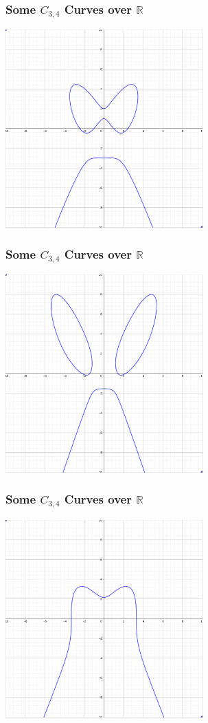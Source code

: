 \documentclass{beamer}
\newcommand{\bb}[1]{\mathbb{#1}}
\begin{document}
\begin{frame}
\frametitle{Some $C_{3,4}$ Curves over $\bb R$}
  \begin{center} \includegraphics[height=7.6cm]{curve1.png} \end{center}
\end{frame}
\begin{frame}
\frametitle{Some $C_{3,4}$ Curves over $\bb R$}
  \begin{center} \includegraphics[height=7.6cm]{curve2.png} \end{center}
\end{frame}
\begin{frame}
\frametitle{Some $C_{3,4}$ Curves over $\bb R$}
  \begin{center} \includegraphics[height=7.6cm]{curve3.png} \end{center}
\end{frame}
\end{document}
